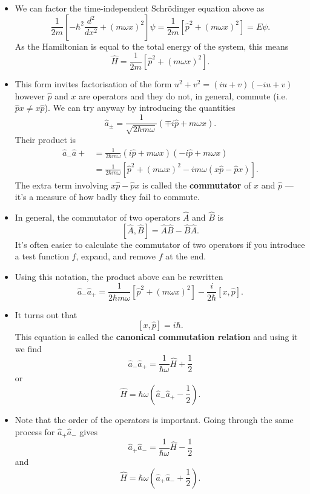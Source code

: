 \documentclass{article}
\begin{document}
\begin{itemize}
  \item We can factor the time-independent Schrödinger equation above as \[\frac{1}{2 m} \left[ -\hbar^2 \frac{d^2}{d x^2} + (m \omega x)^2 \right] \psi = \frac{1}{2 m} [\hat{p}^2 + (m \omega x)^2] = E \psi.\] As the Hamiltonian is equal to the total energy of the system, this means \[\hat{H} = \frac{1}{2 m} [\hat{p}^2 + (m \omega x)^2].\]

  \item This form invites factorisation of the form $u^2 + v^2 = (i u + v) (-i u + v)$ however $\hat{p}$ and $x$ are operators and they do not, in general, commute (i.e. $\hat{p} x \ne x \hat{p}$). We can try anyway by introducing the quantities \[\hat{a}_\pm = \frac{1}{\sqrt{2 \hbar m \omega}} (\mp i \hat{p} + m \omega x).\] Their product is \begin{align*}
          \hat{a}_- \hat{a}+ & = \frac{1}{2 \hbar m \omega} (i \hat{p} + m \omega x) (-i \hat{p} + m \omega x)                 \\
                             & = \frac{1}{2 \hbar m \omega} [\hat{p}^2 + (m \omega x)^2 - i m \omega (x \hat{p} - \hat{p} x)].
        \end{align*} The extra term involving $x \hat{p} - \hat{p} x$ is called the \textbf{commutator} of $x$ and $\hat{p}$ — it's a measure of how badly they fail to commute.

  \item In general, the commutator of two operators $\hat{A}$ and $\hat{B}$ is \[[\hat{A}, \hat{B}] = \hat{A} \hat{B} - \hat{B} \hat{A}.\] It's often easier to calculate the commutator of two operators if you introduce a test function $f$, expand, and remove $f$ at the end.

  \item Using this notation, the product above can be rewritten \[\hat{a}_- \hat{a}_+ = \frac{1}{2 \hbar m \omega} [\hat{p}^2 + (m \omega x)^2] - \frac{i}{2 \hbar} [x, \hat{p}].\]

  \item It turns out that \[[x, \hat{p}] = i \hbar.\] This equation is called the \textbf{canonical commutation relation} and using it we find \[\hat{a}_- \hat{a}_+ = \frac{1}{\hbar \omega} \hat{H} + \frac{1}{2}\] or \[\hat{H} = \hbar \omega \left( \hat{a}_- \hat{a}_+ - \frac{1}{2} \right).\]

  \item Note that the order of the operators is important. Going through the same process for $\hat{a}_+ \hat{a}_-$ gives \[\hat{a}_+ \hat{a}_- = \frac{1}{\hbar \omega} \hat{H} - \frac{1}{2}\] and \[\hat{H} = \hbar \omega \left( \hat{a}_+ \hat{a}_- + \frac{1}{2} \right).\]


\end{itemize}
\end{document}
